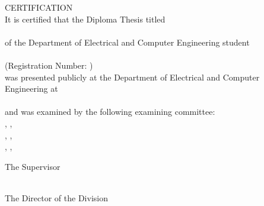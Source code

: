 \pagestyle{empty}
\begin{center}
{\LARGE CERTIFICATION\\[1cm]}
\large It is certified that the Diploma Thesis titled\\[1cm]
\textbf{\bf \large \doctitleEnglish }\\[1cm]
of the Department of Electrical and Computer Engineering student\\[1cm]
\textbf{\nommeEnglish}\\[0.5cm]
(Registration Number: \studnum)\\[1cm]
was presented publicly at the Department of Electrical and Computer Engineering at\\[1cm]
\Large{\imerominiaExetasis}\\[1cm]
\large and was examined by the following examining committee:\\[1cm]
\supnameEN, \suptitleEN, \uoPEnglish\\[0.2cm]
\epitropiEnaEN, \epitropiEnaTitleEN, \uoPEnglish\\[0.2cm]
\epitropiDyoEN, \epitropiDyoTitleEN, \uoPEnglish\\[1cm]
\end{center}
\begin{minipage}{0.5\textwidth}
\begin{flushleft} \large
The Supervisor\\[0.5cm]
\supnameEN\\
\emph{\suptitleEN}
\end{flushleft}
\end{minipage}
\begin{minipage}{0.5\textwidth}
\begin{flushright} \large
The Director of the Division\\[0.5cm]
\headofdivisionEN\\
\emph{\headofdivisiontitleEN}
\end{flushright}
\end{minipage}
